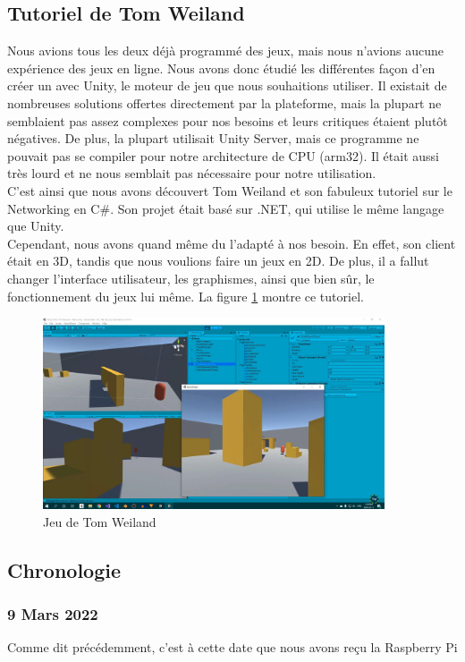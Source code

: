 \documentclass[a4paper]{article}
\begin{document}
\subsection{Tutoriel de Tom Weiland}
Nous avions tous les deux déjà programmé des jeux, mais nous n'avions aucune expérience des jeux en ligne. Nous avons donc étudié les différentes façon d'en créer un avec Unity, le moteur de jeu que nous souhaitions utiliser. Il existait de nombreuses solutions offertes directement par la plateforme, mais la plupart ne semblaient pas assez complexes pour nos besoins et leurs critiques étaient plutôt négatives. De plus, la plupart utilisait Unity Server, mais ce programme ne pouvait pas se compiler pour notre architecture de CPU (arm32\cite{arm32}). Il était aussi très lourd et ne nous semblait pas nécessaire pour notre utilisation.\\
C'est ainsi que nous avons découvert Tom Weiland et son fabuleux tutoriel\cite{tomweiland} sur le Networking en C\#. Son projet était basé sur .NET\cite{dotnet}, qui utilise le même langage que Unity.  \\
Cependant, nous avons quand même du l'adapté à nos besoin. En effet, son client était en 3D, tandis que nous voulions faire un jeux en 2D. De plus, il a fallut changer l'interface utilisateur, les graphismes, ainsi que bien sûr, le fonctionnement du jeux lui même. La figure \ref{fig:tutorial} montre ce tutoriel.
\begin{figure}
	\centering
    \includegraphics[width=0.9\textwidth]{images/tutorial.png}
    \caption{Jeu de Tom Weiland}
    \label{fig:tutorial}
\end{figure}

\subsection{Chronologie}
\subsubsection{9 Mars 2022}
Comme dit précédemment, c'est à cette date que nous avons reçu la Raspberry Pi
\end{document}
